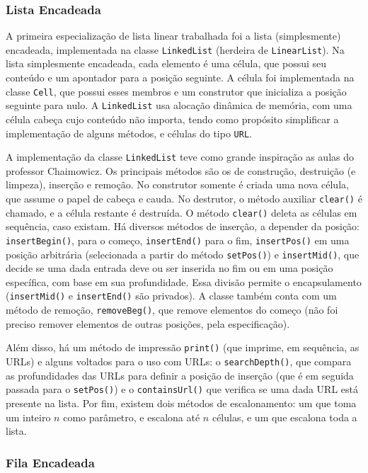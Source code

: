 \documentclass{article}
\def\code#1{\texttt{#1}}
\begin{document}
\subsubsection{Lista Encadeada}

A primeira especialização de lista linear trabalhada foi a lista (simplesmente) encadeada, implementada na classe \code{LinkedList} (herdeira de \code{LinearList}). Na lista simplesmente encadeada, cada elemento é uma célula, que possui seu conteúdo e um apontador para a posição seguinte. A célula foi implementada na classe \code{Cell}, que possui esses membros e um construtor que inicializa a posição seguinte para nulo. A \code{LinkedList} usa alocação dinâmica de memória, com uma célula cabeça cujo conteúdo não importa, tendo como propósito simplificar a implementação de alguns métodos, e células do tipo \code{URL}.

A implementação da classe \code{LinkedList} teve como grande inspiração as aulas do professor Chaimowicz. Os principais métodos são os de construção, destruição (e limpeza), inserção e remoção. No construtor somente é criada uma nova célula, que assume o papel de cabeça e cauda. No destrutor, o método auxiliar \code{clear()} é chamado, e a célula restante é destruída. O método \code{clear()} deleta as células em sequência, caso existam. Há diversos métodos de inserção, a depender da posição: \code{insertBegin()}, para o começo, \code{insertEnd()} para o fim, \code{insertPos()} em uma posição arbitrária (selecionada a partir do método \code{setPos()}) e \code{insertMid()}, que decide se uma dada entrada deve ou ser inserida no fim ou em uma posição específica, com base em sua profundidade. Essa divisão permite o encapsulamento (\code{insertMid()} e \code{insertEnd()} são privados). A classe também conta com um método de remoção, \code{removeBeg()}, que remove elementos do começo (não foi preciso remover elementos de outras posições, pela especificação).

Além disso, há um método de impressão \code{print()} (que imprime, em sequência, as URLs) e alguns voltados para o uso com URLs: o \code{searchDepth()}, que compara as profundidades das URLs para definir a posição de inserção (que é em seguida passada para o \code{setPos()}) e o \code{containsUrl()} que verifica se uma dada URL está presente na lista. Por fim, existem dois métodos de escalonamento: um que toma um inteiro \( n \) como parâmetro, e escalona até \( n \) células, e um que escalona toda a lista.

\subsubsection{Fila Encadeada}
\end{document}

